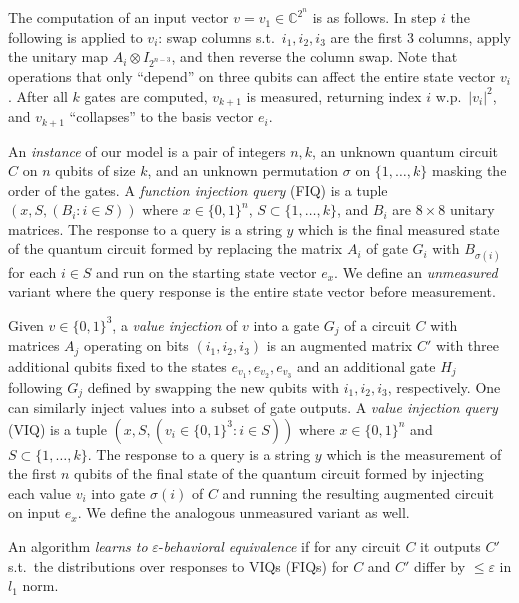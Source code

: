 \documentclass{colt2015}
\newcommand{\C}{\mathbb{C}}
\begin{document}
The computation of an input vector $v = v_1 \in \C^{2^n}$ 
is as follows. In step $i$ the following  is applied to $v_i$:
swap columns s.t.\ $i_1, i_2, i_3$ are the first $3$ columns, apply the
unitary map $A_i \otimes I_{2^{n-3}}$, and then  reverse the column
swap. Note that operations that only ``depend'' on three qubits can
affect the entire state vector $v_i$. After all $k$ gates are computed, 
$v_{k+1}$ is measured, returning index $i$ w.p.\
$|v_i|^2$, and $v_{k+1}$ ``collapses'' to the basis vector $e_i$. 

An \emph{instance} of our model is a pair of integers $n,k$, an unknown
quantum circuit $C$ on $n$ qubits of size $k$, and an unknown permutation
$\sigma$ on $\{ 1,\dots, k\}$ masking the order of the gates. A \emph{function
injection query} (FIQ) is a tuple $(x, S, ( B_i : i \in S ))$ where $x \in \{
0,1 \}^n$, $S \subset \{ 1, \dots, k \}$, and $B_i$ are $8 \times 8$ unitary
matrices. The response to a query is a string $y$ which is the final measured
state of the quantum circuit formed by replacing the matrix $A_i$ of gate $G_i$
with $B_{\sigma(i)}$ for each $i \in S$ and run on the starting state vector
$e_x$. We define an \emph{unmeasured} variant where the query response is the
entire state vector before measurement.

Given $v \in \{0,1\}^3$, a \emph{value injection} of $v$ into a gate $G_j$ of a
circuit $C$ with matrices $A_j$ operating on bits $(i_1, i_2, i_3)$ is an
augmented matrix $C'$ with three additional qubits fixed to the states
$e_{v_1}, e_{v_2}, e_{v_3}$ and an additional gate $H_j$ following $G_j$
defined by swapping the new qubits with $i_1, i_2, i_3$, respectively. One can
similarly inject values into a subset of gate outputs. A \emph{value injection
query} (VIQ) is a tuple $(x, S, ( v_i \in \{0,1\}^3 : i \in S))$ where $x \in
\{ 0,1 \}^n$ and $S \subset \{ 1, \dots, k \}$. The response to a query is a
string $y$ which is the measurement of the first $n$ qubits of the final state
of the quantum circuit formed by injecting each value $v_i$ into gate
$\sigma(i)$ of $C$ and running the resulting augmented circuit on input $e_x$.
We define the analogous unmeasured variant as well.

An algorithm \emph{learns to} $\varepsilon$-\emph{behavioral equivalence}
if for any circuit $C$ it
outputs $C'$ s.t.\ the distributions over responses to VIQs
(FIQs) for $C$ and $C'$ differ by $\le \varepsilon$ in $l_1$ norm. 
\end{document}

